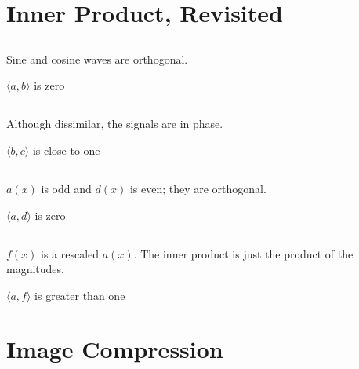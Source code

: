 \documentclass[11pt]{article}
\begin{document}
\section{Inner Product, Revisited}

\subsection{} %
Sine and cosine waves are orthogonal.
\begin{mdframed}
    $\langle a, b \rangle$ is zero
\end{mdframed}

\subsection{} %
Although dissimilar, the signals are in phase.
\begin{mdframed}
    $\langle b, c \rangle$ is close to one
\end{mdframed}

\subsection{} %
$a(x)$ is odd and $d(x)$ is even; they are orthogonal.
\begin{mdframed}
    $\langle a, d \rangle$ is zero
\end{mdframed}

\subsection{} %
$f(x)$ is a rescaled $a(x)$.
The inner product is just the product of the magnitudes.
\begin{mdframed}
    $\langle a, f \rangle$ is greater than one
\end{mdframed}

\section{Image Compression}
\end{document}
